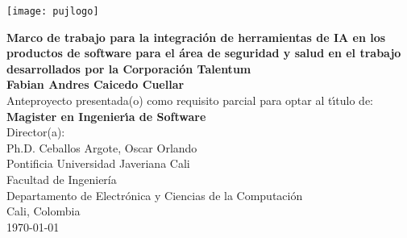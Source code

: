 \begin{center}
\thispagestyle{empty}
\vspace*{-2.2cm}
\begin{center}
    \texttt{[image: pujlogo]}~\\[1cm]
\end{center}
\textbf{\huge
Marco de trabajo para la integración de herramientas de IA en los productos de software para el área de seguridad y salud en el trabajo desarrollados por la Corporación Talentum
}\\[1.2cm]

\Large\textbf{Fabian Andres Caicedo Cuellar}\\[1.2cm]
\small Anteproyecto presentada(o) como requisito parcial para optar al
t\'{\i}tulo de:\\
\textbf{Magister en Ingenier\'{\i}a de Software}\\[1.3cm]
Director(a):\\
Ph.D. Ceballos Argote, Oscar Orlando\\[1.3cm]

Pontificia Universidad Javeriana Cali\\
Facultad de Ingeniería\\
Departamento de Electrónica y Ciencias de la Computación\\
Cali, Colombia\\
\today\\
\end{center}

